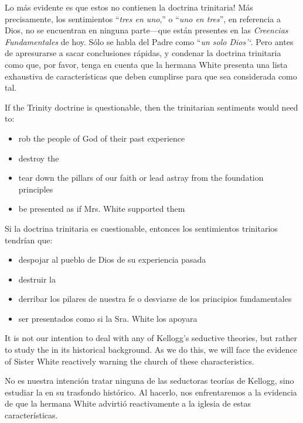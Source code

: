 Lo más evidente es que estos  no contienen la doctrina trinitaria! Más precisamente, los sentimientos “\textit{tres en uno},” o “\textit{uno en tres}”, en referencia a Dios, no se encuentran en ninguna parte—que están presentes en las \textit{Creencias Fundamentales} de hoy. Sólo se habla del Padre como “\textit{un solo Dios’‘}. Pero antes de apresurarse a sacar conclusiones rápidas, y condenar la doctrina trinitaria como que, por favor, tenga en cuenta que la hermana White presenta una lista exhaustiva de características que deben cumplirse para que sea considerada como tal.


If the Trinity doctrine is questionable, then the trinitarian sentiments would need to:
\begin{itemize}
    \item rob the people of God of their past experience
    \item destroy the 
    \item tear down the pillars of our faith or lead astray from the foundation principles
    \item be presented as if Mrs. White supported them
\end{itemize}


Si la doctrina trinitaria es cuestionable, entonces los sentimientos trinitarios tendrían que:
\begin{itemize}
    \item despojar al pueblo de Dios de su experiencia pasada
    \item destruir la 
    \item derribar los pilares de nuestra fe o desviarse de los principios fundamentales
    \item ser presentados como si la Sra. White los apoyara
\end{itemize}


It is not our intention to deal with any of Kellogg’s seductive theories, but rather to study the  in its historical background. As we do this, we will face the evidence of Sister White reactively warning the church of these characteristics.


No es nuestra intención tratar ninguna de las seductoras teorías de Kellogg, sino estudiar la  en su trasfondo histórico. Al hacerlo, nos enfrentaremos a la evidencia de que la hermana White advirtió reactivamente a la iglesia de estas características.





% 
